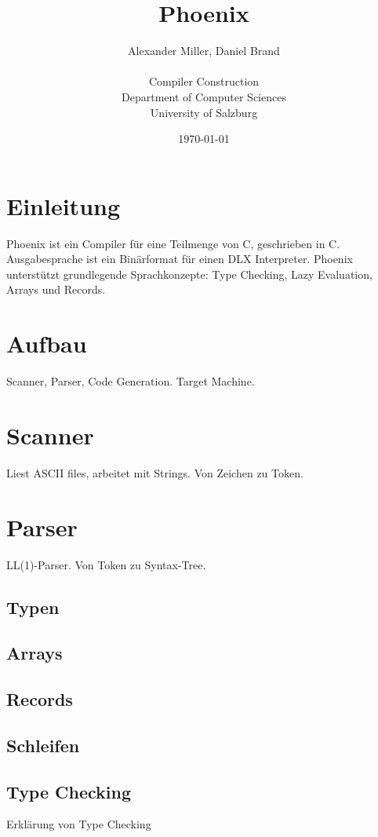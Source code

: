 \documentclass{article}
\title{Phoenix}
\author{Alexander Miller, Daniel Brand \\ \\
		Compiler Construction \\
		Department of Computer Sciences \\
		University of Salzburg}
\date{\today}
\begin{document}
	\maketitle
	\tableofcontents

	\section{Einleitung}
	Phoenix ist ein Compiler für eine Teilmenge von C, geschrieben in C.
	Ausgabesprache ist ein Binärformat für einen DLX Interpreter.
	Phoenix unterstützt grundlegende Sprachkonzepte: Type Checking, Lazy Evaluation, Arrays und Records.

	\section{Aufbau}
	Scanner, Parser, Code Generation. Target Machine.

	\section{Scanner}
	Liest ASCII files, arbeitet mit Strings. Von Zeichen zu Token.

	\section{Parser}
	LL(1)-Parser. Von Token zu Syntax-Tree.

	\subsection{Typen}

	\subsection{Arrays}

	\subsection{Records}

	\subsection{Schleifen}

	\subsection{Type Checking}
	Erklärung von Type Checking
\end{document}
